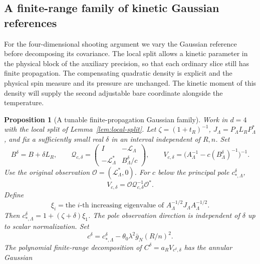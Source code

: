 \documentclass[11pt]{article}
\newtheorem{proposition}[theorem]{Proposition}
\theoremstyle{definition}
\begin{document}
\subsection{A finite-range family of kinetic Gaussian references}
\label{sec:kinetic-reference-family}

For the four-dimensional shooting argument we vary the Gaussian
reference before decomposing its covariance. The local split
allows a kinetic parameter in the physical block of the auxiliary
precision, so that each ordinary slice still has finite propagation.
The compensating quadratic density is explicit and the physical
spin measure and its pressure are unchanged. The kinetic moment of
this density will supply the second adjustable bare coordinate
alongside the temperature.

\begin{proposition}[A tunable finite-propagation Gaussian family]
\label{prop:kinetic-reference-family}
Work in \(d=4\) with the local split of
Lemma~\ref{lem:local-split}. Let \(\zeta=(1+t_R)^{-1}\),
\(J_\Lambda=P_\Lambda L_RP_\Lambda^*\), and fix a sufficiently
small real \(\delta\) in an interval independent of \(R,n\).
Set
\begin{equation}
 B^\delta=B+\delta L_R,\qquad
 \mathcal Q_{c,\delta}=
 \begin{pmatrix}
 I&-\mathcal L_\Lambda\\
 -\mathcal L_\Lambda^*& B^\delta_\Lambda/c
 \end{pmatrix},
 \qquad
 V_{c,\delta}=\bigl(A_\Lambda^{-1}
                         -c(B^\delta_\Lambda)^{-1}\bigr)^{-1}.
\end{equation}
Use the original observation \(\mathcal O=(\mathcal L_\Lambda^*,0)\).
For \(c\) below the principal pole \(c_{*,\Lambda}^\delta\),
\begin{equation}
 V_{c,\delta}=\mathcal O\mathcal Q_{c,\delta}^{-1}\mathcal O^*.
\end{equation}
Define
\begin{equation}
 \xi_i=\text{the \(i\)-th increasing eigenvalue of }
 A_\Lambda^{-1/2}J_\Lambda A_\Lambda^{-1/2}.
\end{equation}
Then \(c_{*,\Lambda}^\delta=1+(\zeta+\delta)\xi_1\).
The pole observation direction is independent of \(\delta\)
up to scalar normalization. Set
\begin{equation}
 c^\delta=c_{*,\Lambda}^\delta
             -\theta_0\lambda^2\bar g_N (R/n)^2.
\end{equation}
The polynomial finite-range decomposition of
\(C^\delta=a_R V_{c^\delta,\delta}\) has the annular Gaussian

\end{proposition}
\end{document}
